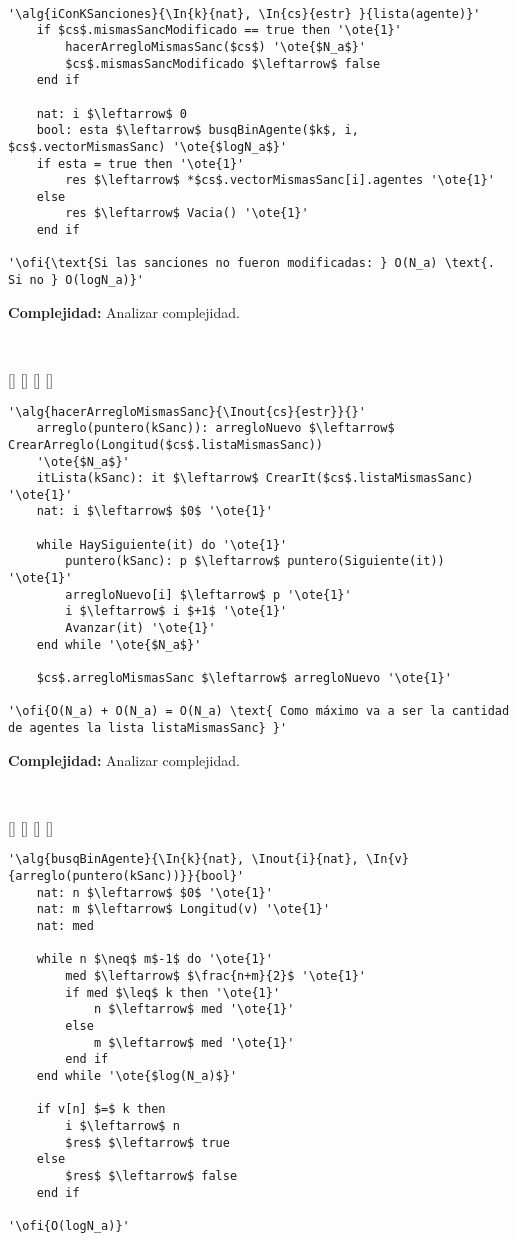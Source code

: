 ~


\begin{lstlisting}[mathescape]
'\alg{iConKSanciones}{\In{k}{nat}, \In{cs}{estr} }{lista(agente)}'
	if $cs$.mismasSancModificado == true then '\ote{1}'
		hacerArregloMismasSanc($cs$) '\ote{$N_a$}'
		$cs$.mismasSancModificado $\leftarrow$ false
	end if

	nat: i $\leftarrow$ 0
	bool: esta $\leftarrow$ busqBinAgente($k$, i, $cs$.vectorMismasSanc) '\ote{$logN_a$}'
	if esta = true then '\ote{1}'
		res $\leftarrow$ *$cs$.vectorMismasSanc[i].agentes '\ote{1}'
	else
		res $\leftarrow$ Vacia() '\ote{1}'
	end if

'\ofi{\text{Si las sanciones no fueron modificadas: } O(N_a) \text{. Si no } O(logN_a)}'
\end{lstlisting}

\textbf{Complejidad:} Analizar complejidad.

~


[]
{}
[]
[]
[]

\begin{lstlisting}[mathescape]
'\alg{hacerArregloMismasSanc}{\Inout{cs}{estr}}{}'
	arreglo(puntero(kSanc)): arregloNuevo $\leftarrow$ CrearArreglo(Longitud($cs$.listaMismasSanc))
	'\ote{$N_a$}'
	itLista(kSanc): it $\leftarrow$ CrearIt($cs$.listaMismasSanc) '\ote{1}'
	nat: i $\leftarrow$ $0$ '\ote{1}'

	while HaySiguiente(it) do '\ote{1}'
		puntero(kSanc): p $\leftarrow$ puntero(Siguiente(it)) '\ote{1}'
		arregloNuevo[i] $\leftarrow$ p '\ote{1}'
		i $\leftarrow$ i $+1$ '\ote{1}'
		Avanzar(it) '\ote{1}'
	end while '\ote{$N_a$}'

	$cs$.arregloMismasSanc $\leftarrow$ arregloNuevo '\ote{1}'

'\ofi{O(N_a) + O(N_a) = O(N_a) \text{ Como máximo va a ser la cantidad de agentes la lista listaMismasSanc} }'
\end{lstlisting}

\textbf{Complejidad:} Analizar complejidad.

~


[]
{}
[]
[]
[]

\begin{lstlisting}[mathescape]
'\alg{busqBinAgente}{\In{k}{nat}, \Inout{i}{nat}, \In{v}{arreglo(puntero(kSanc))}}{bool}'
	nat: n $\leftarrow$ $0$ '\ote{1}'
	nat: m $\leftarrow$ Longitud(v) '\ote{1}'
	nat: med

	while n $\neq$ m$-1$ do '\ote{1}'
		med $\leftarrow$ $\frac{n+m}{2}$ '\ote{1}'
		if med $\leq$ k then '\ote{1}'
			n $\leftarrow$ med '\ote{1}'
		else
			m $\leftarrow$ med '\ote{1}'
		end if
	end while '\ote{$log(N_a)$}'

	if v[n] $=$ k then
		i $\leftarrow$ n
		$res$ $\leftarrow$ true
	else
		$res$ $\leftarrow$ false
	end if

'\ofi{O(logN_a)}'
\end{lstlisting}


